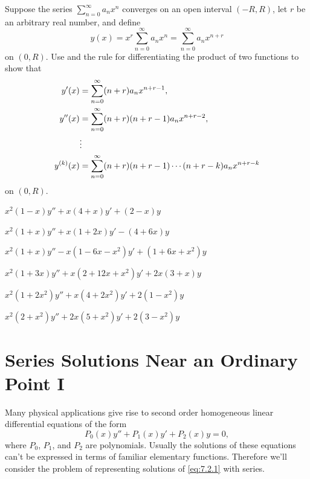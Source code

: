 \begin{exerciselist}
\item\label{exer:7.1.20}Suppose the series $\sum_{n=0}^\infty a_nx^n$ converges on an
open interval $(-R,R)$, let $r$ be an arbitrary real number, and
define
\[
y(x)=x^r\sum_{n=0}^\infty a_nx^n=\sum_{n=0}^\infty a_nx^{n+r}
\]
on $(0,R)$. Use  and the rule for
differentiating the product of two functions to show that
\begin{align*}
y'(x)&=\displaystyle{\sum_{n=0}^\infty  (n+r)a_nx^{n+r-1}},\\
y''(x)&=\displaystyle{\sum_{n=0}^\infty(n+r)(n+r-1)a_nx^{n+r-2}},\\
&\vdots\\
y^{(k)}(x)&=\displaystyle{\sum_{n=0}^\infty(n+r)(n+r-1)\cdots(n+r-k)a_nx^{n+r-k}}
\end{align*}
on $(0,R)$.


\item\label{exer:7.1.21}$x^2(1-x)y''+x(4+x)y'+(2-x)y$

\item\label{exer:7.1.22}$x^2(1+x)y''+x(1+2x)y'-(4+6x)y$

\item\label{exer:7.1.23}$x^2(1+x)y''-x(1-6x-x^2)y'+(1+6x+x^2)y$

\item\label{exer:7.1.24}$x^2(1+3x)y''+x(2+12x+x^2)y'+2x(3+x)y$

\item\label{exer:7.1.25}$x^2(1+2x^2)y''+x(4+2x^2)y'+2(1-x^2)y$

\item\label{exer:7.1.26}$x^2(2+x^2)y''+2x(5+x^2)y'+2(3-x^2)y$

\end{exerciselist}

\section{Series Solutions Near an Ordinary Point I}
\label{sec:series_ordinary_i}

Many physical applications give rise to second order homogeneous
linear  differential equations of the form
\begin{equation}\label{eq:7.2.1}
P_0(x)y''+P_1(x)y'+P_2(x)y=0,
\end{equation}
where $P_0$, $P_1$, and $P_2$ are polynomials. Usually the solutions
of these equations can't be expressed in terms of familiar elementary
functions. Therefore we'll consider the problem of representing
solutions of \eqref{eq:7.2.1} with series.

